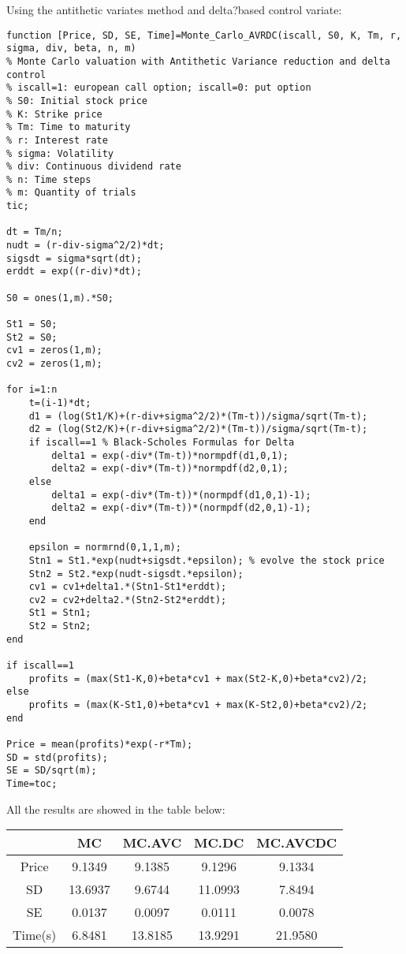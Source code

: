\documentclass{article}
\begin{document}
Using the antithetic variates method and delta?based control variate:
\begin{verbatim}
function [Price, SD, SE, Time]=Monte_Carlo_AVRDC(iscall, S0, K, Tm, r, sigma, div, beta, n, m)
% Monte Carlo valuation with Antithetic Variance reduction and delta control
% iscall=1: european call option; iscall=0: put option
% S0: Initial stock price
% K: Strike price
% Tm: Time to maturity
% r: Interest rate
% sigma: Volatility
% div: Continuous dividend rate
% n: Time steps
% m: Quantity of trials
tic;

dt = Tm/n;
nudt = (r-div-sigma^2/2)*dt;
sigsdt = sigma*sqrt(dt);
erddt = exp((r-div)*dt);

S0 = ones(1,m).*S0;

St1 = S0;
St2 = S0;
cv1 = zeros(1,m);
cv2 = zeros(1,m);

for i=1:n
    t=(i-1)*dt;
    d1 = (log(St1/K)+(r-div+sigma^2/2)*(Tm-t))/sigma/sqrt(Tm-t);
    d2 = (log(St2/K)+(r-div+sigma^2/2)*(Tm-t))/sigma/sqrt(Tm-t);
    if iscall==1 % Black-Scholes Formulas for Delta
        delta1 = exp(-div*(Tm-t))*normpdf(d1,0,1);
        delta2 = exp(-div*(Tm-t))*normpdf(d2,0,1);
    else
        delta1 = exp(-div*(Tm-t))*(normpdf(d1,0,1)-1);
        delta2 = exp(-div*(Tm-t))*(normpdf(d2,0,1)-1);
    end

    epsilon = normrnd(0,1,1,m);
    Stn1 = St1.*exp(nudt+sigsdt.*epsilon); % evolve the stock price
    Stn2 = St2.*exp(nudt-sigsdt.*epsilon);
    cv1 = cv1+delta1.*(Stn1-St1*erddt);
    cv2 = cv2+delta2.*(Stn2-St2*erddt);
    St1 = Stn1;
    St2 = Stn2;
end

if iscall==1
    profits = (max(St1-K,0)+beta*cv1 + max(St2-K,0)+beta*cv2)/2;
else
    profits = (max(K-St1,0)+beta*cv1 + max(K-St2,0)+beta*cv2)/2;
end

Price = mean(profits)*exp(-r*Tm);
SD = std(profits);
SE = SD/sqrt(m);
Time=toc;
\end{verbatim}

All the results are showed in the table below:

\begin{table}[h]
\begin{tabular}{|c|c|c|c|c|}

\hline
& MC & MC.AVC & MC.DC & MC.AVCDC \\
\hline
Price & 9.1349 & 9.1385 & 9.1296 & 9.1334 \\
\hline
SD & 13.6937 & 9.6744 & 11.0993 & 7.8494 \\
\hline
SE & 0.0137 & 0.0097 & 0.0111 & 0.0078 \\
\hline
Time(s) & 6.8481 & 13.8185 & 13.9291 & 21.9580 \\
\hline

\end{tabular}
\end{table}
\end{document}
